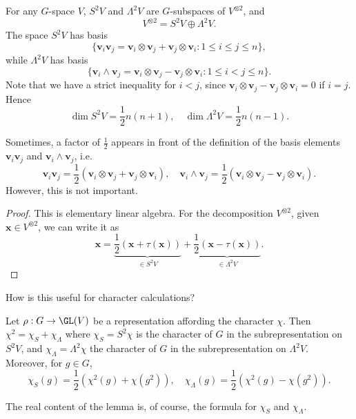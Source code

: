 \documentclass[a4paper]{article}
\begin{document}
\begin{lemma}
  For any $G$-space $V$, $S^2 V$ and $\Lambda^2 V$ are $G$-subspaces of $V^{\otimes 2}$, and
  \[
    V^{\otimes 2} = S^2 V \oplus \Lambda^2 V.
  \]
  The space $S^2 V$ has basis
  \[
    \{\mathbf{v}_i \mathbf{v}_j = \mathbf{v}_i \otimes \mathbf{v}_j + \mathbf{v}_j \otimes \mathbf{v}_i: 1 \leq i \leq j \leq n\},
  \]
  while $\Lambda^2 V$ has basis
  \[
    \{\mathbf{v}_i \wedge \mathbf{v}_j = \mathbf{v}_i \otimes \mathbf{v}_j - \mathbf{v}_j \otimes \mathbf{v}_i: 1 \leq i < j \leq n\}.
  \]
  Note that we have a strict inequality for $i < j$, since $\mathbf{v}_i \otimes \mathbf{v}_j - \mathbf{v}_j \otimes \mathbf{v}_i = 0$ if $i = j$.
  Hence
  \[
    \dim S^2 V = \frac{1}{2}n(n + 1),\quad \dim \Lambda^2 V = \frac{1}{2}n(n - 1).
  \]
\end{lemma}
Sometimes, a factor of $\frac{1}{2}$ appears in front of the definition of the basis elements $\mathbf{v}_i \mathbf{v}_j$ and $\mathbf{v}_i \wedge \mathbf{v}_j$, i.e.
\[
  \mathbf{v}_i \mathbf{v}_j = \frac{1}{2}(\mathbf{v}_i \otimes \mathbf{v}_j + \mathbf{v}_j \otimes \mathbf{v}_i),\quad \mathbf{v}_i \wedge \mathbf{v}_j = \frac{1}{2}(\mathbf{v}_i \otimes \mathbf{v}_j - \mathbf{v}_j \otimes \mathbf{v}_i).
\]
However, this is not important.

\begin{proof}
  This is elementary linear algebra. For the decomposition $V^{\otimes 2}$, given $\mathbf{x} \in V^{\otimes 2}$, we can write it as
  \[
    \mathbf{x} = \underbrace{\frac{1}{2}(\mathbf{x} + \tau(\mathbf{x}))}_{\in S^2 V} + \underbrace{\frac{1}{2}(\mathbf{x} - \tau(\mathbf{x}))}_{\in \Lambda^2 V}.
  \]
\end{proof}

How is this useful for character calculations?
\begin{lemma}\index{$\Lambda^2 \chi$}
  Let $\rho: G \to \GL(V)$ be a representation affording the character $\chi$. Then $\chi^2 = \chi_S + \chi_{\Lambda}$ where $\chi_S = S^2 \chi$ is the character of $G$ in the subrepresentation on $S^2 V$, and $\chi_{\Lambda} = \Lambda^2 \chi$ the character of $G$ in the subrepresentation on $\Lambda^2 V$. Moreover, for $g \in G$,
  \[
    \chi_S(g) = \frac{1}{2} (\chi^2 (g) + \chi(g^2)),\quad \chi_\Lambda(g) = \frac{1}{2}(\chi^2(g) - \chi(g^2)).
  \]
\end{lemma}
The real content of the lemma is, of course, the formula for $\chi_S$ and $\chi_\Lambda$.
\end{document}
